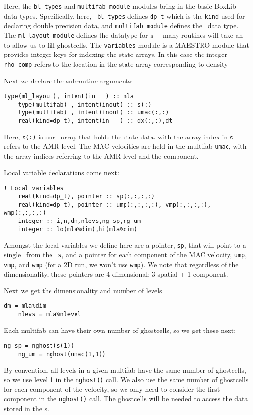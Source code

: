 \noindent Here, the {\tt bl\_types} and {\tt multifab\_module} modules
bring in the basic BoxLib data types. Specifically, here, {\tt
  bl\_types} defines {\tt dp\_t} which is the {\tt kind} used for
declaring double precision data, and {\tt multifab\_module} defines
the \multifab\ data type.  The {\tt ml\_layout\_module} defines the
datatype for a \mllayout---many routines will take an \mllayout
to allow us to fill ghostcells.  The {\tt variables} module is a MAESTRO
module that provides integer keys for indexing the state arrays.  In
this case the integer {\tt rho\_comp} refers to the location in the
state array corresponding to density.

Next we declare the subroutine arguments:

\begin{lstlisting}[language={[95]fortran},mathescape=false]
    type(ml_layout), intent(in   ) :: mla
    type(multifab) , intent(inout) :: s(:)
    type(multifab) , intent(inout) :: umac(:,:)
    real(kind=dp_t), intent(in   ) :: dx(:,:),dt
\end{lstlisting}
Here, {\tt s(:)} is our \multifab\ array that holds the state data.
with the array index in {\tt s} refers to the AMR level.  The MAC 
velocities are held in the multifab {\tt umac}, with the array
indices referring to the AMR level and the component.


Local variable declarations come next:
\begin{lstlisting}[language={[95]fortran},mathescape=false]
    ! Local variables
    real(kind=dp_t), pointer :: sp(:,:,:,:)
    real(kind=dp_t), pointer :: ump(:,:,:,:), vmp(:,:,:,:), wmp(:,:,:,:)
    integer :: i,n,dm,nlevs,ng_sp,ng_um
    integer :: lo(mla%dim),hi(mla%dim)
\end{lstlisting}

\noindent Amongst the local variables we define here are a pointer,
{\tt sp}, that will point to a single \fab\ from the
\multifab\ {\tt s}, and a pointer for each component of the MAC
velocity, {\tt ump}, {\tt vmp}, and {\tt wmp} (for a 2D run,
we won't use {\tt wmp}).  We note that regardless of the dimensionality,
these pointers are 4-dimensional: 3 spatial + 1 component.

Next we get the dimensionality and number of levels
\begin{lstlisting}[language={[95]fortran},mathescape=false]
    dm = mla%dim
    nlevs = mla%nlevel
\end{lstlisting}


Each multifab can have their own number of ghostcells, so we get
these next:
\begin{lstlisting}[language={[95]fortran},mathescape=false]
    ng_sp = nghost(s(1))
    ng_um = nghost(umac(1,1))
\end{lstlisting}
By convention, all levels in a given multifab have the same number of
ghostcells, so we use level 1 in the {\tt nghost()} call.  We also use
the same number of ghostcells for each component of the velocity, so
we only need to consider the first component in the {\tt nghost()}
call.  The ghostcells will be needed to access the data stored in the
\fab s.

